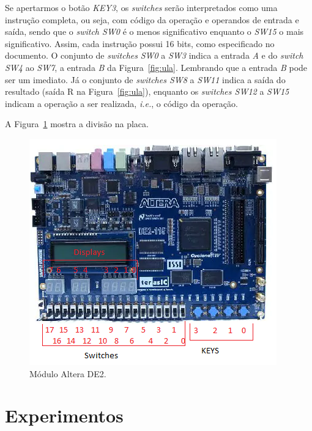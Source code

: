 \documentclass[11pt,a4paper,titlepage]{article}
\begin{document}
Se apertarmos o botão \textit{KEY3}, os \textit{switches} serão interpretados como uma instrução completa, ou seja, com código da operação e operandos de entrada e saída, sendo que o \textit{switch SW0} é o menos significativo enquanto o \textit{SW15} o mais significativo.
Assim, cada instrução possui 16 bits, como especificado no documento.
O conjunto de \textit{switches} \textit{SW0} a \textit{SW3} indica a entrada \textit{A} e do \textit{switch SW4} ao \textit{SW7}, a entrada \textit{B} da Figura~\ref{fig:ula}.
Lembrando que a entrada \textit{B} pode ser um imediato.
Já o conjunto de \textit{switches SW8} a \textit{SW11} indica a saída do resultado (saída R na Figura~\ref{fig:ula}), enquanto os \textit{switches SW12} a \textit{SW15} indicam a operação a ser realizada, \textit{i.e.}, o código da operação.

A Figura~\ref{fig:fpga} mostra a divisão na placa.

\begin{figure}[h]
\centering
\includegraphics[]{images/FPGA.png}
\caption{Módulo Altera DE2.}
\label{fig:fpga}
\end{figure}


\section{Experimentos}
\end{document}
